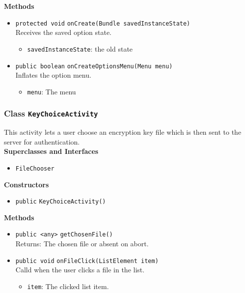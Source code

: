 \textbf{Methods}
\begin{itemize}
\item \lstinline|protected void| \lstinline|onCreate|\lstinline|(Bundle savedInstanceState)|\\
Receives the saved option state.
\begin{itemize}
\item \lstinline|savedInstanceState|: the old state
\end{itemize}



\item \lstinline|public boolean| \lstinline|onCreateOptionsMenu|\lstinline|(Menu menu)|\\
Inflates the option menu.
\begin{itemize}
\item \lstinline|menu|: The menu
\end{itemize}



\end{itemize}

\subsubsection{Class \lstinline|KeyChoiceActivity|}
This activity lets a user choose an encryption key file
 which is then sent to the server for authentication. \\


\textbf{Superclasses and Interfaces}
\begin{itemize}
\item \lstinline|FileChooser|
\end{itemize}



\textbf{Constructors}
\begin{itemize}
\item \lstinline|public| \lstinline|KeyChoiceActivity|\lstinline|()|




\end{itemize}


\textbf{Methods}
\begin{itemize}
\item \lstinline|public <any>| \lstinline|getChosenFile|\lstinline|()|\\
Returns: The chosen file or absent on abort.



\item \lstinline|public void| \lstinline|onFileClick|\lstinline|(ListElement item)|\\
Calld when the user clicks a file in the list.
\begin{itemize}
\item \lstinline|item|: The clicked list item.
\end{itemize}



\end{itemize}

